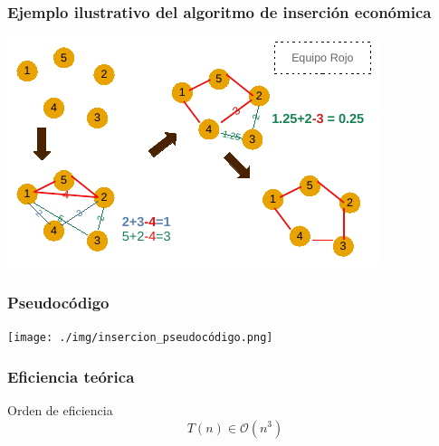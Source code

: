 \documentclass[13pt]{beamer}
\begin{document}
    \begin{frame}
		\frametitle{Ejemplo ilustrativo del algoritmo de inserción económica}
		\begin{center}
			\includegraphics[scale=1.5]{./img/DibInsercion.pdf}
		\end{center}
	\end{frame}

	\begin{frame}
		\frametitle{Pseudocódigo}
		\begin{center}
			\texttt{[image: ./img/insercion\_pseudocódigo.png]}
		\end{center}
	\end{frame}

	\begin{frame}
		\frametitle{Eficiencia teórica}
		\begin{block}{Orden de eficiencia}
			$$T(n) \in \mathcal{O}(n^3)$$
		\end{block}
	\end{frame}
\end{document}
